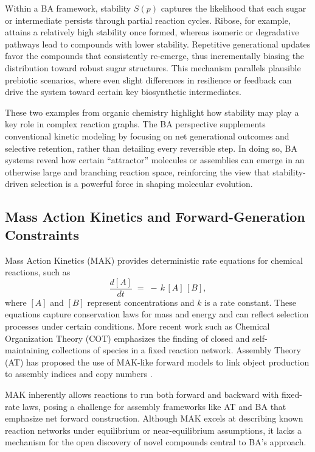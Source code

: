 \documentclass[entropy,article,submit,pdftex,moreauthors]{Definitions/mdpi}
\begin{document}
Within a BA framework, stability $S(p)$ captures the likelihood that each sugar or intermediate persists through partial reaction cycles. Ribose, for example, attains a relatively high stability once formed, whereas isomeric or degradative pathways lead to compounds with lower stability. Repetitive generational updates favor the compounds that consistently re-emerge, thus incrementally biasing the distribution toward robust sugar structures. This mechanism parallels plausible prebiotic scenarios, where even slight differences in resilience or feedback can drive the system toward certain key biosynthetic intermediates.

These two examples from organic chemistry highlight how stability may play a key role in complex reaction graphs. The BA perspective supplements conventional kinetic modeling by focusing on net generational outcomes and selective retention, rather than detailing every reversible step. In doing so, BA systems reveal how certain ``attractor'' molecules or assemblies can emerge in an otherwise large and branching reaction space, reinforcing the view that stability-driven selection is a powerful force in shaping molecular evolution.

\subsection{Mass Action Kinetics and Forward-Generation Constraints}
\label{subsec:mak-forward-limitations}

Mass Action Kinetics (MAK) \cite{TuranyiTomlin2014} provides deterministic rate equations for chemical reactions, such as
\[
\frac{d[A]}{dt} \;=\; -\,k\, [A]\,[B],
\]
where $[A]$ and $[B]$ represent concentrations and $k$ is a rate constant. These equations capture conservation laws for mass and energy and can reflect selection processes under certain conditions. More recent work such as Chemical Organization Theory (COT) \cite{DittrichFenizio2005} emphasizes the finding of closed and self-maintaining collections of species in a fixed reaction network. Assembly Theory (AT) has proposed the use of MAK-like forward models to link object production to assembly indices and copy numbers \cite{walker2023nature}.

MAK inherently allows reactions to run both forward and backward with fixed-rate laws, posing a challenge for assembly frameworks like AT and BA that emphasize net forward construction. Although MAK excels at describing known reaction networks under equilibrium or near-equilibrium assumptions, it lacks a mechanism for the open discovery of novel compounds central to BA’s approach.
\end{document}
